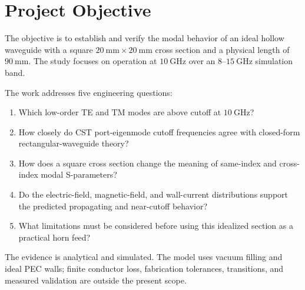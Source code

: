 
\chapter*{Project Objective}
\thispagestyle{fancy}
\begingroup
\setlength{\emergencystretch}{2em}

The objective is to establish and verify the modal behavior of an ideal hollow waveguide with a square \(20~\mathrm{mm}\times20~\mathrm{mm}\) cross section and a physical length of \(90~\mathrm{mm}\). The study focuses on operation at \(10~\mathrm{GHz}\) over an \(8\)--\(15~\mathrm{GHz}\) simulation band.

The work addresses five engineering questions:

\begin{enumerate}
  \item Which low-order TE and TM modes are above cutoff at \(10~\mathrm{GHz}\)?
  \item How closely do CST port-eigenmode cutoff frequencies agree with closed-form rectangular-waveguide theory?
  \item How does a square cross section change the meaning of same-index and cross-index modal S-parameters?
  \item Do the electric-field, magnetic-field, and wall-current distributions support the predicted propagating and near-cutoff behavior?
  \item What limitations must be considered before using this idealized section as a practical horn feed?
\end{enumerate}

The evidence is analytical and simulated. The model uses vacuum filling and ideal PEC walls; finite conductor loss, fabrication tolerances, transitions, and measured validation are outside the present scope.
\par\endgroup
